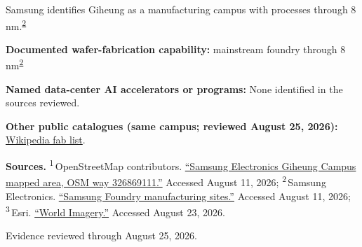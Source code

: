 \begin{minipage}[t][0.90\textheight][t]{\textwidth}
\begin{minipage}[t]{\textwidth}
\begin{minipage}[t]{0.32\textwidth}
\medskip
{\footnotesize Samsung identifies Giheung as a manufacturing campus with processes through 8 nm.\nobreak\textsuperscript{\href{\detokenize{https://semiconductor.samsung.com/foundry/manufacturing/manufacturing-sites/}}{\textcolor{accent}{2}}}\par}
\medskip
{\footnotesize\textbf{Documented wafer-fabrication capability:} mainstream foundry through 8 nm\nobreak\textsuperscript{\href{\detokenize{https://semiconductor.samsung.com/foundry/manufacturing/manufacturing-sites/}}{\textcolor{accent}{2}}}\par}
\end{minipage}
\end{minipage}
\par\vspace{0.65em}
\medskip
{\footnotesize\textbf{Named data-center AI accelerators or programs:} None identified in the sources reviewed.\par}
\smallskip
{\sffamily\scriptsize\color{black!62}\textbf{Other public catalogues (same campus; reviewed August 25, 2026):} \href{\detokenize{https://en.wikipedia.org/w/index.php?title=List_of_semiconductor_fabrication_plants&oldid=1370451124}\#\detokenize{Open_plants}}{Wikipedia fab list}.\par}
\medskip
{\sffamily\scriptsize\setlength{\emergencystretch}{1.5em}\textbf{Sources.} \textsuperscript{1}\,OpenStreetMap contributors. \href{\detokenize{https://www.openstreetmap.org/way/326869111}}{\enquote{Samsung Electronics Giheung Campus mapped area, OSM way 326869111.}} Accessed August 11, 2026; \textsuperscript{2}\,Samsung Electronics. \href{\detokenize{https://semiconductor.samsung.com/foundry/manufacturing/manufacturing-sites/}}{\enquote{Samsung Foundry manufacturing sites.}} Accessed August 11, 2026; \textsuperscript{3}\,Esri. \href{\detokenize{https://www.arcgis.com/home/item.html?id=10df2279f9684e4a9f6a7f08febac2a9}}{\enquote{World Imagery.}} Accessed August 23, 2026.\par}
\vfill
\noindent{\color{hairline}\rule{\linewidth}{0.4pt}}\par\smallskip
{\sffamily\scriptsize\color{black!58} Evidence reviewed through August 25, 2026.\par}
\end{minipage}
\clearpage
